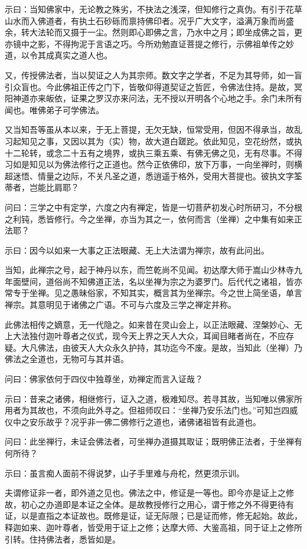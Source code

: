 示曰：当知佛家中，无论教之殊劣，不抉法之浅深，但知修行之真伪。有引于花草山水而入佛道者，有执土石砂砾而禀持佛印者。况乎广大文字，溢满万象而尚盛余，转大法轮而又摄于一尘。然则即心即佛之言，乃水中之月；即坐成佛之旨，更亦镜中之影，不得拘泥于言语之巧。今所劝勉直证菩提之修行，示佛祖单传之妙道，以令其成真实之道人也。

又，传授佛法者，当以契证之人为其宗师。数文字之学者，不足为其导师，如一盲引众盲也。今此佛祖正传之门下，皆敬仰得道契证之哲匠，令佛法住持。是故，冥阳神道亦来皈依，证果之罗汉亦来问法，无不授以开明各个心地之手。余门未所有闻也。唯佛弟子可学佛法。

又当知吾等虽从本以来，于无上菩提，无欠无缺，恒常受用，但因不得承当，故乱习起知见之事，又因以其为（实）物，故大道白蹉跎。依此知见，空花纷然，或执十二轮转，或念二十五有之境界，或执三乘五乘、有佛无佛之见，无有尽事。不得习如是知见以为佛法修行之正道也。然今正依佛印，放下万事，一向坐禅时，则横超迷悟、情量之边际，不关凡圣之道，悉逍遥于格外，受用大菩提也。彼执文字筌蒂者，岂能比肩耶？

问曰：三学之中有定学，六度之内有禅定，皆是一切菩萨初发心时所研习，不分根之利钝，悉皆修行。今之坐禅，亦当为其之一，依何而言（坐禅）之中集有如来正法耶？

示曰：因今以如来一大事之正法眼藏、无上大法谓为禅宗，故有此问出。

当知，此禅宗之号，起于神丹以东，而竺乾尚不见闻。初达摩大师于嵩山少林寺九年面壁间，道俗尚不知佛道正法，名以坐禅为宗之为婆罗门。后代代之诸祖，皆亦常专于坐禅。见之愚昧俗家，不知其实，概言其为坐禅宗。今之世上简坐语，单言禅宗。其意明见于诸佛之广语。不可与六度及三学之禅定并称。

此佛法相传之嫡意，无一代隐之。如来昔在灵山会上，以正法眼藏、涅槃妙心、无上大法独付迦叶尊者之仪式，现今天上界之天人大众，耳闻目睹者尚在，不应存疑。大凡佛法，由彼天人大众永久护持，其功迄今不废。是故，当知此（坐禅）乃佛法之全道也，无物可与其并语。

问曰：佛家依何于四仪中独尊坐，劝禅定而言入证哉？

示曰：昔来之诸佛，相继修行，证入之道，极难知尽。若寻其故，当知唯以佛家所用者为其故也，不须向此外寻之。但祖师叹曰：“坐禅乃安乐法门也。”可知岂四威仪中之安乐故乎？况乎非一佛二佛修行之道也，诸佛诸祖皆有此道也。

问曰：此坐禅行，未证会佛法者，可坐禅办道摄其取证；既明佛正法者，于坐禅有何所待？

示曰：虽言痴人面前不得说梦，山子手里难与舟柁，然更须示训。

夫谓修证非一者，即外道之见也。佛法之中，修证是一等也。即今亦是证上之修故，初心之办道即是本证之全体。是故教授修行之用心，谓于修之外不得更待有证，以是直指之本证故也。既修是证，证无际限；已是证而修，修无起始。故此，释迦如来、迦叶尊者，皆受用于证上之修；达摩大师、大鉴高祖，同于证上之修所引转。住持佛法者，悉皆如是。

